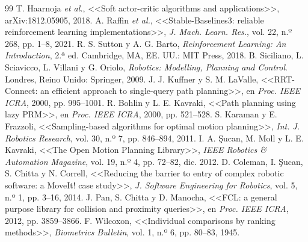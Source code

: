 \documentclass[11pt,a4paper,twoside]{article}
\begin{document}
\begin{thebibliography}{99}
 T. Haarnoja \emph{et al.}, <<Soft actor-critic algorithms and applications>>, arXiv:1812.05905, 2018.
 A. Raffin \emph{et al.}, <<Stable-Baselines3: reliable reinforcement learning implementations>>, \emph{J. Mach. Learn. Res.}, vol. 22, n.º 268, pp. 1--8, 2021.
 R. S. Sutton y A. G. Barto, \emph{Reinforcement Learning: An Introduction}, 2.ª ed. Cambridge, MA, EE. UU.: MIT Press, 2018.
 B. Siciliano, L. Sciavicco, L. Villani y G. Oriolo, \emph{Robotics: Modelling, Planning and Control}. Londres, Reino Unido: Springer, 2009.
 J. J. Kuffner y S. M. LaValle, <<RRT-Connect: an efficient approach to single-query path planning>>, en \emph{Proc. IEEE ICRA}, 2000, pp. 995--1001.
 R. Bohlin y L. E. Kavraki, <<Path planning using lazy PRM>>, en \emph{Proc. IEEE ICRA}, 2000, pp. 521--528.
 S. Karaman y E. Frazzoli, <<Sampling-based algorithms for optimal motion planning>>, \emph{Int. J. Robotics Research}, vol. 30, n.º 7, pp. 846--894, 2011.
 I. A. \c{S}ucan, M. Moll y L. E. Kavraki, <<The Open Motion Planning Library>>, \emph{IEEE Robotics \& Automation Magazine}, vol. 19, n.º 4, pp. 72--82, dic. 2012.
 D. Coleman, I. \c{S}ucan, S. Chitta y N. Correll, <<Reducing the barrier to entry of complex robotic software: a MoveIt! case study>>, \emph{J. Software Engineering for Robotics}, vol. 5, n.º 1, pp. 3--16, 2014.
 J. Pan, S. Chitta y D. Manocha, <<FCL: a general purpose library for collision and proximity queries>>, en \emph{Proc. IEEE ICRA}, 2012, pp. 3859--3866.
 F. Wilcoxon, <<Individual comparisons by ranking methods>>, \emph{Biometrics Bulletin}, vol. 1, n.º 6, pp. 80--83, 1945.
\end{thebibliography}
\end{document}
